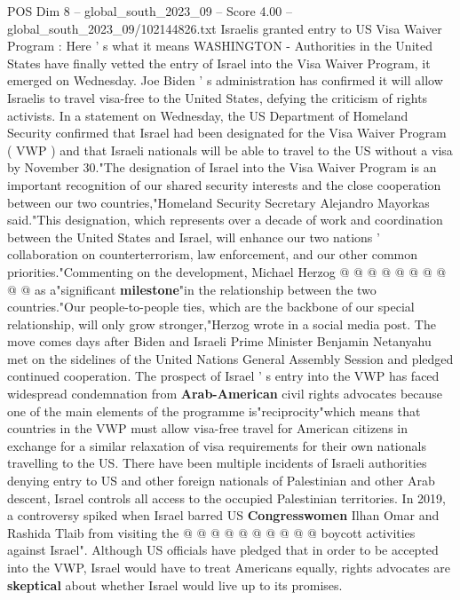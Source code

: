 \begin{textsample}{POS Dim 8 – global\_south\_2023\_09 – Score 4.00 – global\_south\_2023\_09/102144826.txt}  \label{ex:f8_pos_131}
Israelis granted entry to US Visa Waiver Program : Here ' s what it means WASHINGTON - Authorities in the United States have finally vetted the entry of Israel into the Visa Waiver Program, it emerged on Wednesday.
Joe Biden ' s administration has confirmed it will allow Israelis to travel visa-free to the United States, defying the criticism of rights activists.
In a statement on Wednesday, the US Department of Homeland Security confirmed that Israel had been designated for the Visa Waiver Program ( VWP ) and that Israeli nationals will be able to travel to the US without a visa by November 30."The designation of Israel into the Visa Waiver Program is an important recognition of our shared security interests and the close cooperation between our two countries,"Homeland Security Secretary Alejandro Mayorkas said."This designation, which represents over a decade of work and coordination between the United States and Israel, will enhance our two nations ' collaboration on counterterrorism, law enforcement, and our other common priorities."Commenting on the development, Michael Herzog @ @ @ @ @ @ @ @ @ @ as a"significant \textbf{milestone}"in the relationship between the two countries."Our people-to-people ties, which are the backbone of our special relationship, will only grow stronger,"Herzog wrote in a social media post.
The move comes days after Biden and Israeli Prime Minister Benjamin Netanyahu met on the sidelines of the United Nations General Assembly Session and pledged continued cooperation.
The prospect of Israel ' s entry into the VWP has faced widespread condemnation from \textbf{Arab-American} civil rights advocates because one of the main elements of the programme is"reciprocity"which means that countries in the VWP must allow visa-free travel for American citizens in exchange for a similar relaxation of visa requirements for their own nationals travelling to the US.
There have been multiple incidents of Israeli authorities denying entry to US and other foreign nationals of Palestinian and other Arab descent, Israel controls all access to the occupied Palestinian territories.
In 2019, a controversy spiked when Israel barred US \textbf{Congresswomen} Ilhan Omar and Rashida Tlaib from visiting the @ @ @ @ @ @ @ @ @ @ boycott activities against Israel".
Although US officials have pledged that in order to be accepted into the VWP, Israel would have to treat Americans equally, rights advocates are \textbf{skeptical} about whether Israel would live up to its promises.

\end{textsample}
